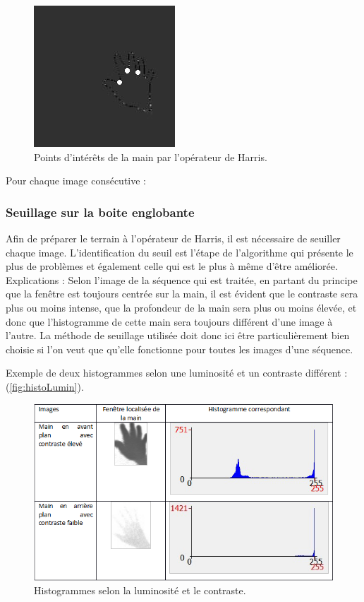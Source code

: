 \begin{figure}[htb!]
\centerline{\includegraphics{harris.jpg}}
\caption{Points d'intérêts de la main par l'opérateur de Harris.}
\label{fig:harris}
\end{figure}

Pour chaque image consécutive :

\subsubsection{Seuillage sur la boite englobante}

Afin de préparer le terrain à l’opérateur de Harris, il est nécessaire de seuiller chaque image. L’identification du seuil est l’étape de l’algorithme qui présente le plus de problèmes et également celle qui est le plus à même d’être améliorée. Explications :
Selon l’image de la séquence qui est traitée, en partant du principe que la fenêtre est toujours centrée sur la main, il est évident que le contraste sera plus ou moins intense, que la profondeur de la main sera plus ou moins élevée, et donc que l’histogramme de cette main sera toujours différent d’une image à l’autre. La méthode de seuillage utilisée doit donc ici être particulièrement bien choisie si l’on veut que qu’elle fonctionne pour toutes les images d’une séquence.

Exemple de deux histogrammes selon une luminosité et un contraste différent : (\autoref{fig:histoLumin}).

\begin{figure}[htb!]
\centerline{\includegraphics{table4.png}}
\caption{Histogrammes selon la luminosité et le contraste.}
\label{fig:histoLumin}
\end{figure}

